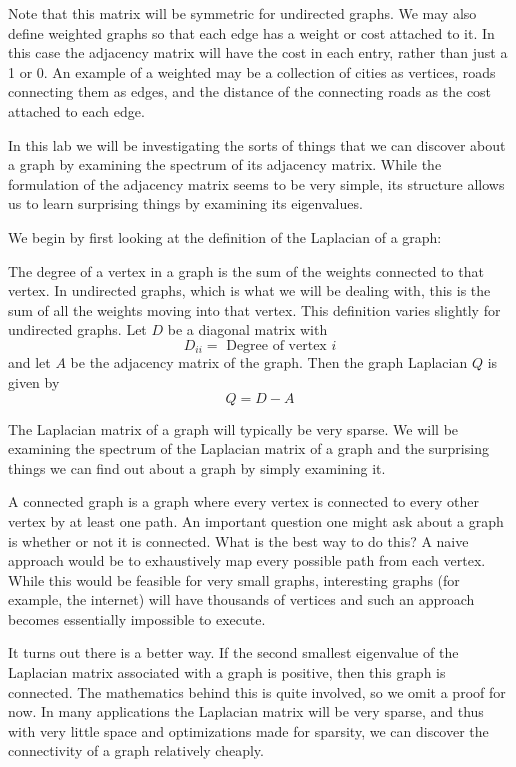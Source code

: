Note that this matrix will be symmetric for undirected graphs.  We may also define weighted graphs so that each edge has a weight or cost attached to it.  In this case the adjacency matrix will have the cost in each entry, rather than just a 1 or 0.  An example of a weighted may be a collection of cities as vertices, roads connecting them as edges, and the distance of the connecting roads as the cost attached to each edge.

In this lab we will be investigating the sorts of things that we can discover about a graph by examining the spectrum of its  adjacency matrix.  While the formulation of the adjacency matrix seems to be very simple, its structure allows us to learn surprising things by examining its eigenvalues.  

We begin by first looking at the definition of the Laplacian of a graph:

\begin{definition}  The degree of a vertex in a graph is the sum of the weights connected to that vertex.  In undirected graphs, which is what we will be dealing with, this is the sum of all the weights moving into that vertex.  This definition varies slightly for undirected graphs. Let $D$ be a diagonal matrix with
\[
D_{ii} = \mbox{ Degree of vertex $i$}
\]
and let $A$ be the adjacency matrix of the graph.  Then the graph Laplacian $Q$ is given by
\[
Q = D-A
\]
\end{definition}

The Laplacian matrix of a graph will typically be very sparse.  We will be examining the spectrum of the Laplacian matrix of a graph and the surprising things we can find out about a graph by simply examining it.    

A connected graph is a graph where every vertex is connected to every other vertex by at least one path.  An important question one might ask about a graph is whether or not it is connected.  What is the best way to do this?  A naive approach would be to exhaustively map every possible path from each vertex.  While this would be feasible for very small graphs, interesting graphs (for example, the internet) will have thousands of vertices and such an approach becomes essentially impossible to execute.

It turns out there is a better way.  If the second smallest eigenvalue of the Laplacian matrix associated with a graph is positive, then this graph is connected.  The mathematics behind this is quite involved, so we omit a proof for now.  In many applications the Laplacian matrix will be very sparse, and thus with very little space and optimizations made for sparsity, we can discover the connectivity of a graph relatively cheaply.

